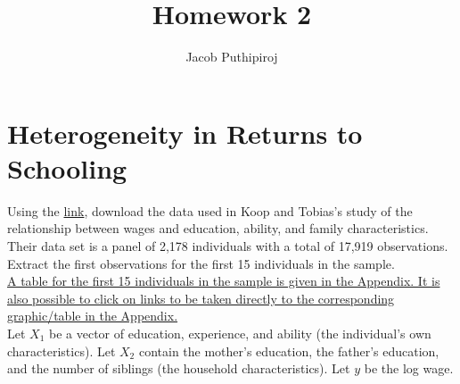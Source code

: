 \documentclass{article}
\begin{document}
\title{\vspace{-2.0cm}Homework 2}
\author{Jacob Puthipiroj}
\maketitle

\section{Heterogeneity in Returns to Schooling}


Using the \href{http://people.stern.nyu.edu/wgreene/Econometrics/PanelDataSets.htm}{link}, download the data used in Koop and Tobias's \cite{koop2004learning} study of the relationship between wages and education, ability, and family characteristics. Their data set is a panel of 2,178 individuals with a total of 17,919 observations. Extract the first observations for the first 15 individuals in the sample.\\

\hyperlink{first15}{A table for the first 15 individuals in the sample is given in the Appendix. It is also possible to click on links to be taken directly to the corresponding graphic/table in the Appendix.}\\

Let $X_1$ be a vector of education, experience, and ability (the individual's own characteristics). Let $X_2$ contain the mother's education, the father's education, and the number of siblings (the household characteristics). Let $y$ be the log wage.
\end{document}
